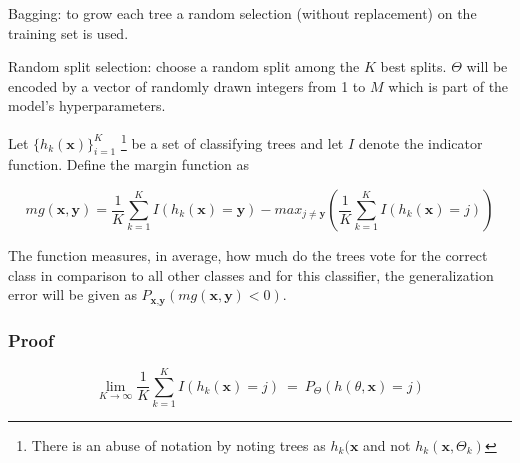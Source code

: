 Bagging: to grow each tree a random selection (without replacement) on the training set is used. 

Random split selection: choose a random split among the $K$ best splits. $\Theta$ will be encoded by a vector of randomly drawn integers from 1 to $M$ which is part of the model's hyperparameters.

Let $\{h_k(\textbf{x})\}_{i=1}^K$  \footnote{There is an abuse of notation by noting trees as $h_k(\textbf{x}$ and not $h_k(\textbf{x}, \Theta_k)$ } be a set of classifying trees and let $I$ denote the indicator function.  Define the margin function as

\begin{equation} \label{eq:rf-marginFun}

 mg(\textbf{x},\textbf{y}) = \frac{1}{K}  \sum_{k=1}^K I(h_k(\textbf{x}) = \textbf{y})  
 - max_{j\neq \textbf{y}}(\frac{1}{K} \sum_{k=1}^K I(h_k(\textbf{x}) = j) ) 

\end{equation}

The function measures, in average, how much do the trees vote for the correct class in comparison to all other classes and for this classifier, the generalization error will be given as 
$ P_{\textbf{x}, \textbf{y} }(mg(\textbf{x}, \textbf{y}) < 0) $.


\subsubsection{Proof}
$$ \lim_{K\to\infty} \frac{1}{K} \sum_{k=1}^K I(h_k(\textbf{x}) = j) \ =   \ P_\Theta(h(\theta,\textbf{x}) = j) $$

